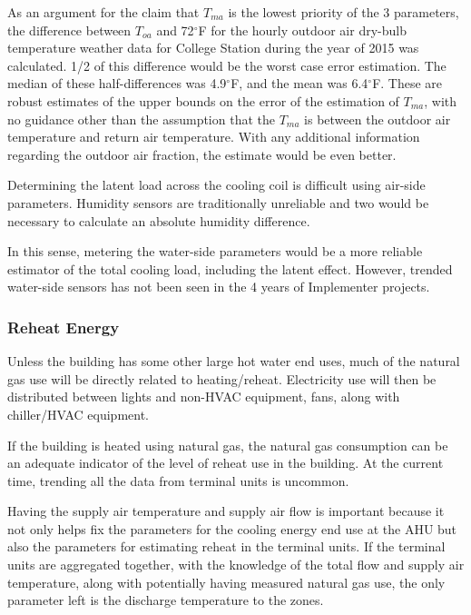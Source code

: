 As an argument for the claim that \(T_{ma}\) is the lowest priority of
the 3 parameters, the difference between \(T_{oa}\) and 72\(^\circ\)F
for the hourly outdoor air dry-bulb temperature weather data for College
Station during the year of 2015 was calculated. 1/2 of this
difference would be the worst case error estimation. The median of these
half-differences was 4.9\(^\circ\)F, and the mean was 6.4\(^\circ\)F.
These are robust estimates of the upper bounds on the error of the
estimation of \(T_{ma}\), with no guidance other than the assumption
that the \(T_{ma}\) is between the outdoor air temperature and return
air temperature. With any additional information regarding the outdoor
air fraction, the estimate would be even better. 

Determining the latent load across the cooling coil is difficult using
air-side parameters. Humidity sensors are traditionally unreliable and
two would be necessary to calculate an absolute humidity
difference.

In this sense, metering the water-side parameters would be a more
reliable estimator of the total cooling load, including the latent
effect. However, trended water-side sensors has not been seen in the 4
years of Implementer projects.

\subsubsection{Reheat Energy}

Unless the building has some other large hot water end uses, much of the
natural gas use will be directly related to heating/reheat. Electricity
use will then be distributed between lights and non-HVAC equipment,
fans, along with chiller/HVAC equipment. 

If the building is heated using natural gas, the natural gas consumption
can be an adequate indicator of the level of reheat use in the building.
At the current time, trending all the data from terminal units is
uncommon. 

Having the supply air temperature and supply air flow is important
because it not only helps fix the parameters for the cooling energy end
use at the AHU but also the parameters for estimating reheat in the
terminal units. If the terminal units are aggregated together, with the
knowledge of the total flow and supply air temperature, along with
potentially having measured natural gas use, the only parameter left is
the discharge temperature to the zones. 

